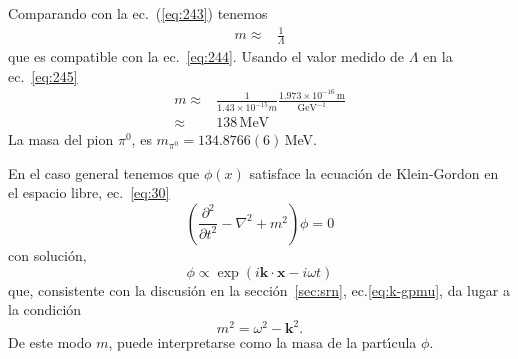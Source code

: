 Comparando con la ec.~(\ref{eq:243}) tenemos
\begin{align}
  m\approx&\frac{1}{\Lambda}
\end{align}
que es compatible con la ec.~\eqref{eq:244}. Usando el valor medido de $\Lambda$ en la ec.~\eqref{eq:245}
\begin{align}
  m\approx&\frac{1}{1.43\times10^{-15}m}\frac{1.973\times10^{-16}\,\text{m}}{\text{GeV}^{-1}}\nonumber\\
  \approx&138\,\text{MeV}
\end{align}
La masa del pion $\pi^0$, es $m_{\pi^0}=134.8766(6)\,$MeV.



En el caso general tenemos que $\phi(x)$ satisface la ecuaci\'on de Klein-Gordon en el espacio libre, ec.~\eqref{eq:30}
\begin{equation}
    (\frac{\partial^2}{\partial t^2}-\nabla^2+m^2)\phi=0
\end{equation}
con soluci\'on, 
\begin{equation}
  \phi\propto\exp(i\mathbf{k}\cdot\mathbf{x}-i\omega t)
\end{equation}
que, consistente con la discusi\'on en la secci\'on~\ref{sec:srn}, ec.\eqref{eq:k-gpmu}, da lugar a la condici\'on 
\begin{equation}
  m^2=\omega^2-\mathbf{k}^2.
\end{equation}
De este modo $m$, puede interpretarse como la masa de la part\'\i cula $\phi$.

